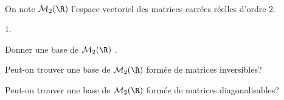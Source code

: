 \documentclass[11pt]{article}%
\begin{document}

\begin{exerciceSP}~\\
  On note $\mathcal{M}_2(\R)$ l'espace vectoriel des matrices carrées
  réelles d'ordre 2.
  \begin{noliste}{1.}
    \setlength{\itemsep}{2mm}
  \item Donner une base de $\mathcal{M}_2(\R)$ .
  \item Peut-on trouver une base de $\mathcal{M}_2(\R)$ formée de
    matrices inversibles?
  \item Peut-on trouver une base de $\mathcal{M}_2(\R)$ formée de
    matrices diagonalisables?
  \end{noliste}
\end{exerciceSP}




\end{document}
